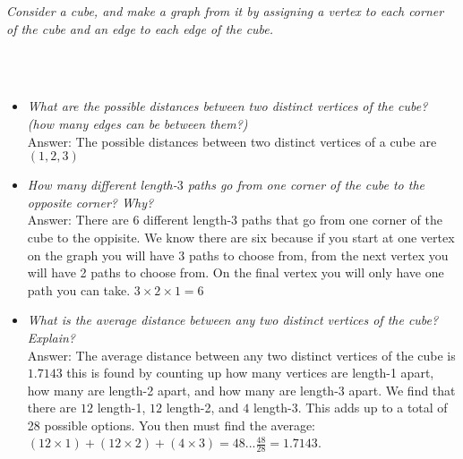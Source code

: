 \documentclass[12pt,letterpaper]{exam}
\begin{document}
\begin{questions}
\question[3.16]
\emph{Consider a cube, and make a graph from it by assigning a vertex to each corner of the cube and an edge to each edge of the cube.}
\\
\\
\\
	\begin{itemize}
	\item \emph{What are the possible distances between two distinct vertices of the cube? (how many edges can be between them?)}
    \\
    Answer: The possible distances between two distinct vertices of a cube are $(1,2,3)$
	
	\item \emph{How many different length-$3$ paths go from one corner of the cube to the opposite corner? Why?}
    \\
    Answer: There are 6 different length-3 paths that go from one corner of the cube to the oppisite. We know there are six because if you start at one vertex on the graph you will have 3 paths to choose from, from the next vertex you will have 2 paths to choose from. On the final vertex you will only have one path you can take. $3 \times 2 \times 1=6$
	
	\item \emph{What is the average distance between any two distinct vertices of the cube? Explain?}
    \\
    Answer: The average distance between any two distinct vertices of the cube is $1.7143$ this is found by counting up how many vertices are length-1 apart, how many are length-2 apart, and how many are length-3 apart. We find that there are $12$ length-1, $12$ length-2, and $4$ length-3. This adds up to a total of 28 possible options. You then must find the average: $(12 \times 1) + (12 \times 2) + (4 \times 3)=48 ... \frac{48}{28}= 1.7143$.
	\end{itemize}





\end{questions}
\end{document}
